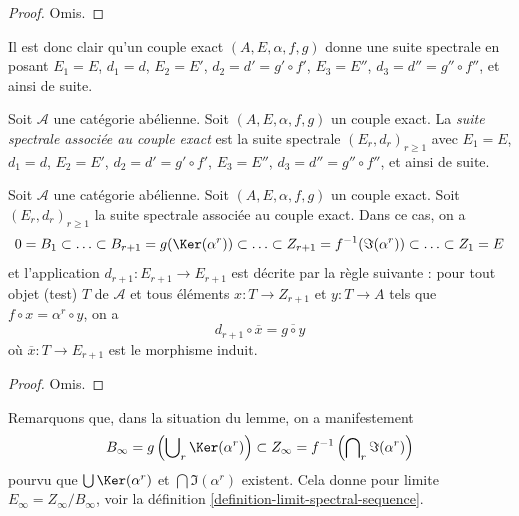 \begin{proof}
Omis.
\end{proof}

\noindent
Il est donc clair qu'un couple exact $(A, E, \alpha, f, g)$
donne une suite spectrale en posant $E_1 = E$, $d_1 = d$,
$E_2 = E'$, $d_2 = d' = g' \circ f'$, $E_3 = E''$, $d_3 = d'' = g'' \circ f''$,
et ainsi de suite.

\begin{definition}
\label{definition-spectral-sequence-associated-exact-couple}
Soit $\mathcal{A}$ une catégorie abélienne.
Soit $(A, E, \alpha, f, g)$ un couple exact.
La {\it suite spectrale associée au couple exact}
est la suite spectrale $(E_r, d_r)_{r \geq 1}$ avec
$E_1 = E$, $d_1 = d$, $E_2 = E'$, $d_2 = d' = g' \circ f'$,
$E_3 = E''$, $d_3 = d'' = g'' \circ f''$,
et ainsi de suite.
\end{definition}

\begin{lemma}
\label{lemma-spectral-sequence-associated-exact-couple}
Soit $\mathcal{A}$ une catégorie abélienne.
Soit $(A, E, \alpha, f, g)$ un couple exact.
Soit $(E_r, d_r)_{r \geq 1}$ la suite spectrale
associée au couple exact.
Dans ce cas, on a
$$
0 = B_1 \subset \ldots \subset
B_{r + 1} = g(\Ker(\alpha^r))
\subset \ldots \subset
Z_{r + 1} = f^{-1}(\Im(\alpha^r))
\subset \ldots \subset Z_1 = E
$$
et l'application $d_{r + 1} : E_{r + 1} \to E_{r + 1}$
est décrite par la règle suivante :
pour tout objet (test) $T$ de $\mathcal{A}$ et tous éléments
$x : T \to Z_{r + 1}$ et $y : T \to A$ tels que
$f \circ x = \alpha^r \circ y$, on a
$$
d_{r + 1} \circ \overline{x} = \overline{g \circ y}
$$
où $\overline{x} : T \to E_{r + 1}$ est le
morphisme induit.
\end{lemma}

\begin{proof}
Omis.
\end{proof}

\noindent
Remarquons que, dans la situation du lemme, on a manifestement
$$
B_\infty = g\left(\bigcup\nolimits_r \Ker(\alpha^r)\right)
\subset
Z_\infty = f^{-1}\left(\bigcap\nolimits_r \Im(\alpha^r)\right)
$$
pourvu que $\bigcup \Ker(\alpha^r)$ et $\bigcap \Im(\alpha^r)$ existent.
Cela donne pour limite $E_\infty = Z_\infty / B_\infty$, voir la
définition \ref{definition-limit-spectral-sequence}.

